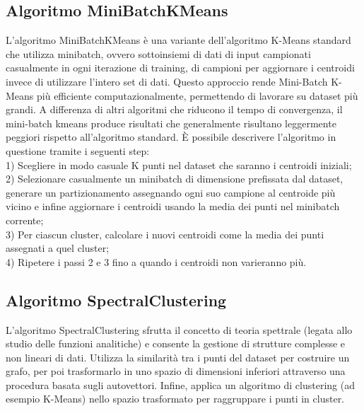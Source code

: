 \documentclass[12pt,oneside]{article}
\begin{document}
    \begin{enumerate}
    \subsection{Algoritmo MiniBatchKMeans}
    \begin{justify}
         L'algoritmo MiniBatchKMeans è una variante dell'algoritmo K-Means standard che utilizza minibatch, ovvero sottoinsiemi di dati di input campionati casualmente in ogni iterazione di training, di campioni per aggiornare i centroidi invece di utilizzare l'intero set di dati. Questo approccio rende Mini-Batch K-Means più efficiente computazionalmente, permettendo di lavorare su dataset più grandi. A differenza di altri algoritmi che riducono il tempo di convergenza, il mini-batch kmeans produce risultati che generalmente risultano leggermente peggiori rispetto all’algoritmo standard. È possibile descrivere l'algoritmo in questione tramite i seguenti step:\\
    1) Scegliere in modo casuale K punti nel dataset che saranno i centroidi iniziali;\\
    2) Selezionare casualmente un minibatch di dimensione prefissata dal dataset, generare un partizionamento           assegnando ogni suo campione al centroide più vicino e infine aggiornare i centroidi usando la media dei punti nel minibatch corrente;\\
    3) Per ciascun cluster, calcolare i nuovi centroidi come la media dei punti assegnati a quel cluster;\\
    4) Ripetere i passi 2 e 3 fino a quando i centroidi non varieranno più.
    \end{justify}
    \end{enumerate}

    \begin{enumerate}
    \subsection{Algoritmo SpectralClustering}
    \begin{justify}
        L'algoritmo SpectralClustering sfrutta il concetto di teoria spettrale (legata allo studio delle funzioni analitiche) e consente la gestione di strutture complesse e non lineari di dati. Utilizza la similarità tra i punti del dataset per costruire un grafo, per poi trasformarlo in uno spazio di dimensioni inferiori attraverso una procedura basata sugli autovettori. Infine, applica un algoritmo di clustering (ad esempio K-Means) nello spazio trasformato per raggruppare i punti in cluster.
    \end{justify}
    \end{enumerate}
\end{document}
